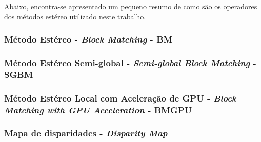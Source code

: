 Abaixo, encontra-se apresentado um pequeno resumo de como são os operadores dos métodos estéreo utilizado neste trabalho.

\subsubsection{Método Estéreo - \textit{Block Matching} - BM}

\subsubsection{Método Estéreo Semi-global - \textit{Semi-global Block Matching} - SGBM}

\subsubsection{Método Estéreo Local com Aceleração de GPU - \textit{Block Matching with GPU Acceleration} - BMGPU}



\subsubsection{Mapa de disparidades - \textit{Disparity Map}}




